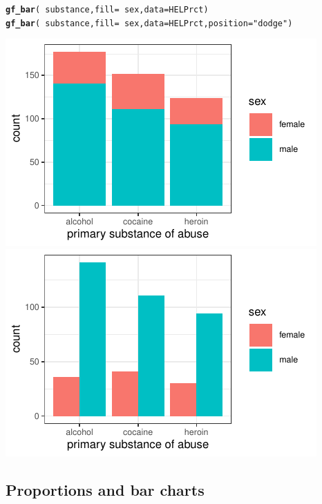\documentclass[twoside]{book}\usepackage[]{graphicx}\usepackage[]{xcolor}
\makeatletter
\def\maxwidth{ %
  \ifdim\Gin@nat@width>\linewidth
    \linewidth
  \else
    \Gin@nat@width
  \fi
}
\newcommand{\hlstr}[1]{\textcolor[rgb]{0.192,0.494,0.8}{#1}}%
\newcommand{\hlopt}[1]{\textcolor[rgb]{0,0,0}{#1}}%
\newcommand{\hlstd}[1]{\textcolor[rgb]{0.345,0.345,0.345}{#1}}%
\newcommand{\hlkwc}[1]{\textcolor[rgb]{0.333,0.667,0.333}{#1}}%
\newcommand{\hlkwd}[1]{\textcolor[rgb]{0.737,0.353,0.396}{\textbf{#1}}}%
\newenvironment{kframe}{%
 \def\at@end@of@kframe{}%
 \ifinner\ifhmode%
  \def\at@end@of@kframe{\end{minipage}}%
  \begin{minipage}{\columnwidth}%
 \fi\fi%
 \def\FrameCommand##1{\hskip\@totalleftmargin \hskip-\fboxsep
 \colorbox{shadecolor}{##1}\hskip-\fboxsep
     \hskip-\linewidth \hskip-\@totalleftmargin \hskip\columnwidth}%
 \MakeFramed {\advance\hsize-\width
   \@totalleftmargin\z@ \linewidth\hsize
   \@setminipage}}%
 {\par\unskip\endMakeFramed%
 \at@end@of@kframe}
\newenvironment{knitrout}{}{} %
\makeatother
\begin{document}
\begin{knitrout}
\color{fgcolor}\begin{kframe}
\begin{alltt}
\hlkwd{gf_bar}\hlstd{(}\hlopt{~}\hlstd{substance,} \hlkwc{fill} \hlstd{=} \hlopt{~}\hlstd{sex,} \hlkwc{data} \hlstd{= HELPrct)}
\hlkwd{gf_bar}\hlstd{(}\hlopt{~}\hlstd{substance,} \hlkwc{fill} \hlstd{=} \hlopt{~}\hlstd{sex,} \hlkwc{data} \hlstd{= HELPrct,} \hlkwc{position} \hlstd{=} \hlstr{"dodge"}\hlstd{)}
\end{alltt}
\end{kframe}

{\centering \includegraphics[width=\maxwidth]{figures/fig-groups-1} 
\includegraphics[width=\maxwidth]{figures/fig-groups-2} 

}



\end{knitrout}

\subsection{Proportions and bar charts}
\end{document}
